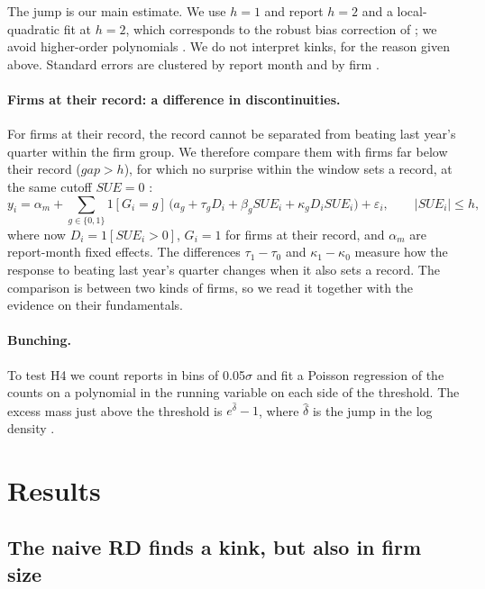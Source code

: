 \documentclass[11pt]{article}
\newcommand{\SUE}{\mathit{SUE}}
\newcommand{\gap}{\mathit{gap}}
\begin{document}
The jump is our main estimate. We use $h=1$ and report $h=2$ and a local-quadratic fit at $h=2$, which corresponds to
the robust bias correction of \citet{calonico2014}; we avoid higher-order polynomials \citep{gelman2019}. We do not
interpret kinks, for the reason given above. Standard errors are clustered by report month and by firm
\citep{petersen2009,cameron2011}.

\paragraph{Firms at their record: a difference in discontinuities.} For firms at their record, the record cannot be
separated from beating last year's quarter within the firm group. We therefore compare them with firms far below their
record ($\gap>h$), for which no surprise within the window sets a record, at the same cutoff $\SUE=0$
\citep{grembi2016}:
\begin{equation}
y_i = \alpha_m + \sum_{g\in\{0,1\}} 1[G_i=g]\,\big(a_g + \tau_g D_i + \beta_g \SUE_i + \kappa_g D_i \SUE_i\big) + \varepsilon_i,
\qquad |\SUE_i|\leq h,
\label{eq:did}
\end{equation}
where now $D_i=1[\SUE_i>0]$, $G_i=1$ for firms at their record, and $\alpha_m$ are report-month fixed effects. The
differences $\tau_1-\tau_0$ and $\kappa_1-\kappa_0$ measure how the response to beating last year's quarter changes
when it also sets a record. The comparison is between two kinds of firms, so we read it together with the evidence on
their fundamentals.

\paragraph{Bunching.} To test H4 we count reports in bins of 0.05$\sigma$ and fit a Poisson regression of the counts
on a polynomial in the running variable on each side of the threshold. The excess mass just above the threshold is
$e^{\hat\delta}-1$, where $\hat\delta$ is the jump in the log density \citep{mccrary2008,cattaneo2020,kleven2016}.

\section{Results}

\subsection{The naive RD finds a kink, but also in firm size}
\end{document}
